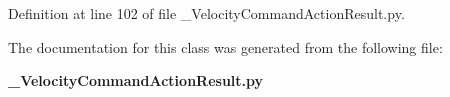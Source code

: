\subsubsection[{status}]{}\label{classoryx__drive__controller_1_1msg_1_1__VelocityCommandActionResult_1_1VelocityCommandActionResult_af95705fa736e1d98f76a18f3747872b4}


\-Definition at line 102 of file \-\_\-\-Velocity\-Command\-Action\-Result.\-py.



\-The documentation for this class was generated from the following file\-:\begin{DoxyCompactItemize}
\item 
{\bf \-\_\-\-Velocity\-Command\-Action\-Result.\-py}\end{DoxyCompactItemize}
